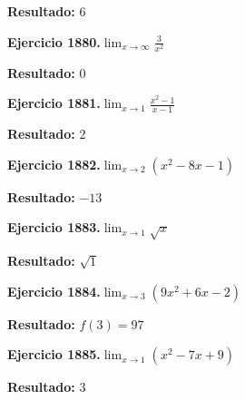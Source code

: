 \documentclass[10pt,a4paper]{article}
\begin{document}
\begin{solbox}
\textbf{Resultado:} \(\displaystyle 6\)
\end{solbox}

\begin{ejbox}
\textbf{Ejercicio 1880.}\quad $\lim_{x\to \infty} \frac{3}{x^2}$
\end{ejbox}

\begin{solbox}
\textbf{Resultado:} \(\displaystyle 0\)
\end{solbox}

\begin{ejbox}
\textbf{Ejercicio 1881.}\quad $\lim_{x\to 1} \frac{x^2-1}{x-1}$
\end{ejbox}

\begin{solbox}
\textbf{Resultado:} \(\displaystyle 2\)
\end{solbox}

\newpage
\begin{ejbox}
\textbf{Ejercicio 1882.}\quad $\lim_{x\to 2} (x^2 -8x -1)$
\end{ejbox}

\begin{solbox}
\textbf{Resultado:} \(\displaystyle -13\)
\end{solbox}

\begin{ejbox}
\textbf{Ejercicio 1883.}\quad $\lim_{x\to 1} \sqrt{x}$
\end{ejbox}

\begin{solbox}
\textbf{Resultado:} \(\displaystyle \sqrt{1}\)
\end{solbox}

\begin{ejbox}
\textbf{Ejercicio 1884.}\quad $\lim_{x\to 3} (9x^2 +6x -2)$
\end{ejbox}

\begin{solbox}
\textbf{Resultado:} \(\displaystyle f(3) = 97\)
\end{solbox}

\newpage
\begin{ejbox}
\textbf{Ejercicio 1885.}\quad $\lim_{x\to 1} (x^2 -7x +9)$
\end{ejbox}

\begin{solbox}
\textbf{Resultado:} \(\displaystyle 3\)
\end{solbox}
\end{document}
